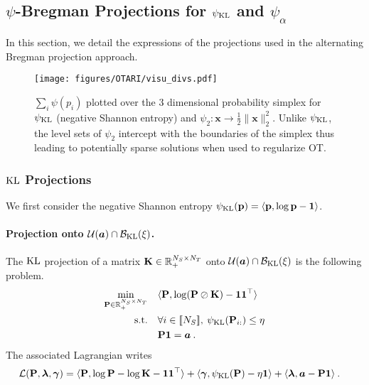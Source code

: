 
\subsection{$\psi$-Bregman Projections for $\psi_{\operatorname{KL}}$ and $\psi_{\alpha}$}\label{sec:proof_projs}

    In this section, we detail the expressions of the projections used in the alternating Bregman projection approach.

    \begin{figure*}[t]
        \begin{center}
        \centerline{\texttt{[image: figures/OTARI/visu\_divs.pdf]}}
        \caption{$\sum_i \psi(p_i)$ plotted over the 3 dimensional probability simplex for $\psi_{\operatorname{KL}}$ (negative Shannon entropy) and $\psi_2 : \bm{x} \to \frac{1}{2} \| \bm{x} \|^2_2$. Unlike $\psi_{\operatorname{KL}}$, the level sets of $\psi_2$ intercept with the boundaries of the simplex thus leading to potentially sparse solutions when used to regularize OT.}
        \label{fig:Ps_vs_Pse}
        \end{center}
    \end{figure*}
    
    \subsubsection{$\operatorname{KL}$ Projections}

    We first consider the negative Shannon entropy $\psi_{\operatorname{KL}}({\mathbf{p}}) = \langle {\mathbf{p}} , \log {\mathbf{p}} - \bm{1} \rangle$.

    \paragraph{Projection onto ${\mathcal{U}}(\bm{a}) \cap \mathcal{B}_{\operatorname{KL}}(\xi)$.}
    The $\operatorname{KL}$ projection of a matrix ${\mathbf{K}} \in \mathbb{R}_+^{N_S \times N_T}$ onto ${\mathcal{U}}(\bm{a}) \cap \mathcal{B}_{\operatorname{KL}}(\xi)$ is the following problem.
    \begin{align}
        \min_{{\mathbf{P}} \in \mathbb{R}_+^{N_S \times N_T}} \quad &\langle {\mathbf{P}}, \log ({\mathbf{P}} \oslash {\mathbf{K}}) - \bm{1}\bm{1}^\top \rangle \\
        \text{s.t.} \quad &\forall i \in {[\![N_S]\!]}, \: \psi_{\operatorname{KL}}({\mathbf{P}}_{i:}) \leq \eta \\
        & {\mathbf{P}} \bm{1} = \bm{a} \:.
    \end{align}
    The associated Lagrangian writes
    \begin{align}
        \mathcal{L}({\mathbf{P}}, \bm{\lambda}, \bm{\gamma}) &= \langle {\mathbf{P}}, \log {\mathbf{P}} - \log {\mathbf{K}} - \bm{1}\bm{1}^\top \rangle + \langle \bm{\gamma}, \psi_{\operatorname{KL}}({\mathbf{P}}) - \eta \bm{1}\rangle + \langle \bm{\lambda}, \bm{a} - {\mathbf{P}} \bm{1} \rangle \:.
    \end{align}
    
